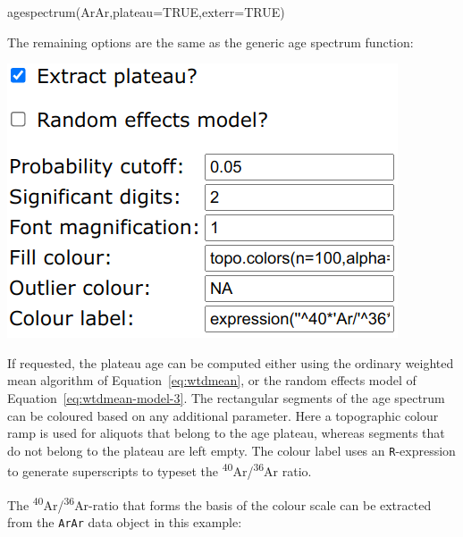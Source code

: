 \begin{refsection}
\begin{console}
agespectrum(ArAr,plateau=TRUE,exterr=TRUE)
\end{console}

The remaining options are the same as the generic age spectrum
function:\\

\noindent\begin{minipage}[t]{.4\linewidth}
\strut\vspace*{-\baselineskip}\newline
\includegraphics[width=\linewidth]{../figures/ArArAgeSpectrumOtherOptions.png}\\
\end{minipage}
\begin{minipage}[t]{.6\linewidth}
  If requested, the plateau age can be computed either using the
  ordinary weighted mean algorithm of Equation~\ref{eq:wtdmean}, or
  the random effects model of Equation~\ref{eq:wtdmean-model-3}.  The
  rectangular segments of the age spectrum can be coloured based on
  any additional parameter. Here a topographic colour ramp is used for
  aliquots that belong to the age plateau, whereas segments that do
  not belong to the plateau are left empty. The colour label uses an
  \texttt{R}-expression to generate superscripts to typeset the
  \textsuperscript{40}Ar/\textsuperscript{36}Ar ratio.
\end{minipage}

The \textsuperscript{40}Ar/\textsuperscript{36}Ar-ratio that forms the
basis of the colour scale can be extracted from the \texttt{ArAr} data
object in this example:

  

\end{refsection}
